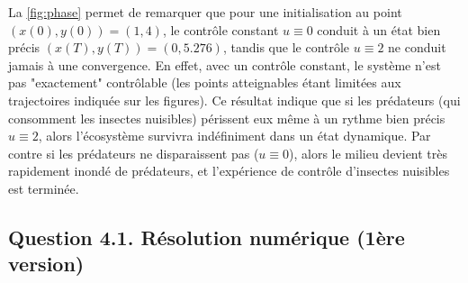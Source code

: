 \documentclass[
	french,
	11pt, %
]{fphw}
\begin{document}
La \cref{fig:phase} permet de remarquer que pour une initialisation au point $(x(0),y(0)) = (1,4)$, le contrôle constant $u\equiv0$ conduit à un état bien précis $(x(T),y(T)) = (0,5.276)$, tandis que le contrôle $u\equiv2$ ne conduit jamais à une convergence. En effet, avec un contrôle constant, le système n'est pas "exactement" contrôlable (les points atteignables étant limitées aux trajectoires indiquée sur les figures). Ce résultat indique que si les prédateurs (qui consomment les insectes nuisibles) périssent eux même à un rythme bien précis $u\equiv2$, alors l'écosystème survivra indéfiniment dans un état dynamique. Par contre si les prédateurs ne disparaissent pas ($u\equiv0$), alors le milieu devient très rapidement inondé de prédateurs, et l'expérience de contrôle d'insectes nuisibles est terminée.


\subsection*{Question 4.1. Résolution numérique (1ère version)}
\end{document}
